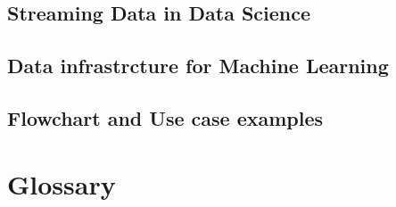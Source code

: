 \documentclass[a4paper, 11pt]{book}
\begin{document}
    \section{Streaming Data in Data Science}
    

    \section{Data infrastrcture for Machine Learning}
    

    \section{Flowchart and Use case examples}
    

    \chapter{Glossary}
\end{document}
